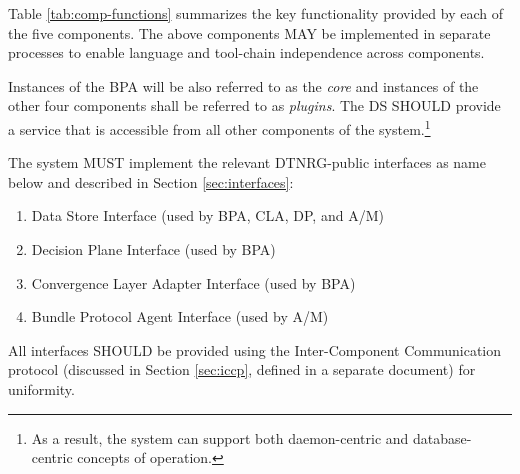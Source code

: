 \documentclass[11pt]{article}
\begin{document}
Table \ref{tab:comp-functions} summarizes the key functionality provided by
each of the five components. The above components MAY be implemented in
separate processes to enable language and tool-chain independence across
components. 

Instances of the BPA will be also referred to as the {\it core} and instances
of the other four components shall be referred to as {\it plugins}.  The DS
SHOULD provide a service that is accessible from all other components of the
system.\footnote{As a result, the system can support both daemon-centric and
database-centric concepts of operation.}

The system MUST implement the relevant DTNRG-public interfaces as name below
and described in Section \ref{sec:interfaces}:
\vspace{-4pt}
\begin{enumerate}
\setlength{\parskip}{-3pt}
\item Data Store Interface (used by BPA, CLA, DP, and A/M)
\item Decision Plane Interface (used by BPA)
\item Convergence Layer Adapter Interface (used by BPA)
\item Bundle Protocol Agent Interface (used by A/M)
\end{enumerate}

All interfaces SHOULD be provided using the Inter-Component Communication 
protocol (discussed in Section \ref{sec:iccp}, defined in a separate document)
for uniformity.
\end{document}
